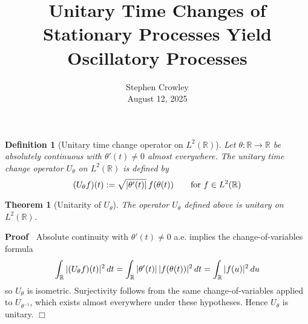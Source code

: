 \documentclass{article}
\newcommand{\assign}{:=}
\newcommand{\tmaffiliation}[1]{\\ #1}
\newenvironment{proof}{\noindent\textbf{Proof\ }}{\hspace*{\fill}$\Box$\medskip}
\newtheorem{definition}{Definition}
{\theorembodyfont{\rmfamily}\newtheorem{remark}{Remark}}
\newtheorem{theorem}{Theorem}
\begin{document}
\title{Unitary Time Changes of Stationary Processes Yield Oscillatory
Processes}

\author{
  Stephen Crowley
  \tmaffiliation{August 12, 2025}
}

\date{}

\maketitle

\begin{definition}
  [Unitary time change operator on $L^2 (\mathbb{R})$] Let $\theta :
  \mathbb{R} \to \mathbb{R}$ be absolutely continuous with $\theta' (t) \neq
  0$ almost everywhere. The unitary time change operator $U_{\theta}$ on $L^2
  (\mathbb{R})$ is defined by
  \begin{equation}
    (U_{\theta} f) (t) \assign \sqrt{| \theta' (t) |}  \hspace{0.17em} f
    (\theta (t))  \qquad \text{for } f \in L^2 (\mathbb{R})
  \end{equation}
\end{definition}

\begin{theorem}
  [Unitarity of $U_{\theta}$] The operator $U_{\theta}$ defined above is
  unitary on $L^2 (\mathbb{R})$.
\end{theorem}

\begin{proof}
  Absolute continuity with $\theta' (t) \neq 0$ a.e. implies the
  change-of-variables formula
  \begin{equation}
    \int_{\mathbb{R}} | (U_{\theta} f) (t) |^2 \hspace{0.17em} dt =
    \int_{\mathbb{R}} | \theta' (t) | \hspace{0.17em} |f (\theta (t)) |^2
    \hspace{0.17em} dt = \int_{\mathbb{R}} |f (u) |^2  \hspace{0.17em} du
  \end{equation}
  so $U_{\theta}$ is isometric. Surjectivity follows from the same
  change-of-variables applied to $U_{\theta^{- 1}}$, which exists almost
  everywhere under these hypotheses. Hence $U_{\theta}$ is unitary.
\end{proof}
\end{document}
